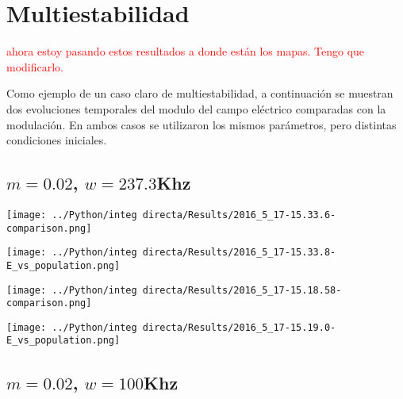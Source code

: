 \section{Multiestabilidad}
\textcolor{red}{ahora estoy pasando estos resultados a donde están los mapas. Tengo que modificarlo.}

Como ejemplo de un caso claro de multiestabilidad, a continuación se muestran dos evoluciones temporales del modulo del campo eléctrico comparadas con la modulación. 
En ambos casos se utilizaron los mismos parámetros, pero distintas condiciones iniciales.

	\subsection{$m=0.02$, $w=237.3$Khz}
		\begin{minipage}{0.5\textwidth}
			
			\centering
			\texttt{[image: ../Python/integ directa/Results/2016\_5\_17-15.33.6-comparison.png]}
			
		\end{minipage}
		\begin{minipage}{0.5\textwidth}
			
			\centering
			\texttt{[image: ../Python/integ directa/Results/2016\_5\_17-15.33.8-E\_vs\_population.png]}
			
		\end{minipage}
		
		
		
		\begin{minipage}{0.5\textwidth}
			
			\centering
			\texttt{[image: ../Python/integ directa/Results/2016\_5\_17-15.18.58-comparison.png]}
		
		\end{minipage}
		\begin{minipage}{0.5\textwidth}
			
			\centering
			\texttt{[image: ../Python/integ directa/Results/2016\_5\_17-15.19.0-E\_vs\_population.png]}
			
		\end{minipage}
	
	
	\subsection{$m=0.02$, $w=100$Khz}
		
